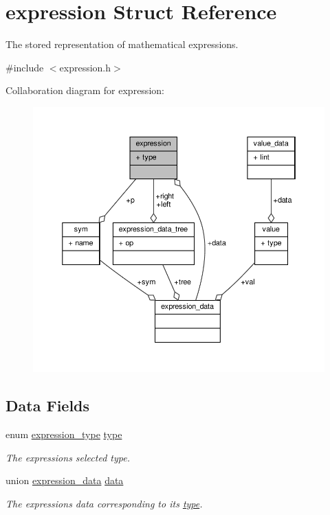 \hypertarget{structexpression}{}\section{expression Struct Reference}
\label{structexpression}


The stored representation of mathematical expressions.  




{\ttfamily \#include $<$expression.\+h$>$}



Collaboration diagram for expression\+:
\nopagebreak
\begin{figure}[H]
\begin{center}
\leavevmode
\includegraphics[width=350pt]{structexpression__coll__graph}
\end{center}
\end{figure}
\subsection*{Data Fields}
\begin{DoxyCompactItemize}
\item 
enum \hyperlink{expression_8h_a5a6601c4e142145f0e87051cb21ece0f}{expression\+\_\+type} \hyperlink{structexpression_a6c50b44c70231c1b3752f8516daa967c}{type}
\begin{DoxyCompactList}\small\item\em The expression\textquotesingle{}s selected type. \end{DoxyCompactList}\item 
union \hyperlink{unionexpression__data}{expression\+\_\+data} \hyperlink{structexpression_addb4bda6d311d21f3fd2bfdd12fc70ab}{data}
\begin{DoxyCompactList}\small\item\em The expression\textquotesingle{}s data corresponding to it\textquotesingle{}s \hyperlink{structexpression_a6c50b44c70231c1b3752f8516daa967c}{type}. \end{DoxyCompactList}\end{DoxyCompactItemize}


